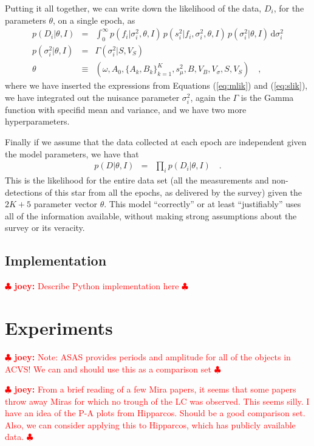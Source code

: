 \documentclass[12pt,preprint]{aastex}
\newcommand{\dd}{\mathrm{d}}
\newcommand{\fobs}{f_i}
\newcommand{\sobs}{s^2_i}
\newcommand{\joey}[1] { \textcolor{red} {
\ensuremath{\clubsuit} {\bf joey:}  {#1}
\ensuremath{\clubsuit} } }%
\begin{document}
Putting it all together, we can write down the likelihood of the data, $D_i$, for the parameters $\theta$, on a single epoch, as
\begin{eqnarray}\displaystyle
p(D_i|\theta,I) &=& \int_0^{\infty} p(\fobs |\sigma^2_i,\theta,I)\, p(\sobs | \fobs, \sigma^2_i,\theta,I)\, p(\sigma^2_i | \theta, I)\,\dd \sigma^2_i
\\
p(\sigma^2_i|\theta, I) &=& \Gamma(\sigma^2_i | S, V_S)
\\
\theta &\equiv& (\omega, A_0, \{A_k, B_k\}_{k=1}^K, s^2_\mu, B, V_B, V_{\sigma}, S, V_S) \quad ,
\end{eqnarray}
where we have inserted the expressions from Equations (\ref{eq:mlik}) and (\ref{eq:slik}), we have integrated out the nuisance parameter $\sigma^2_i$, again the $\Gamma$ is the Gamma function with specifid mean and variance, and we have two more hyperparameters.

Finally if we assume that the data collected at each epoch are independent given the model parameters, we have that
\begin{eqnarray}\displaystyle
p(D|\theta,I) &=& \prod_i p(D_i|\theta,I)
\quad.
\end{eqnarray}
This is the likelihood for the entire
data set (all the measurements and non-detections of this star from
all the epochs, as delivered by the survey) given the $2K + 5$ parameter vector $\theta$.  This model
``correctly'' or at least ``justifiably'' uses all of the information
available, without making strong assumptions about the survey or its
veracity.





\subsection{Implementation}
\label{ss:implemenation}



\joey{Describe Python implementation here}




\section{Experiments}
\label{sec:experiments}

\joey{Note: ASAS provides periods and amplitude for all of the objects in ACVS!  We can and should use this as a comparison set}

\joey{From a brief reading of a few Mira papers, it seems that some papers throw away Miras for which no trough of the LC was observed.  This seems silly.  I have an idea of the P-A plots from Hipparcos.  Should be a good comparison set.  Also, we can consider applying this to Hipparcos, which has publicly available data.}
\end{document}
